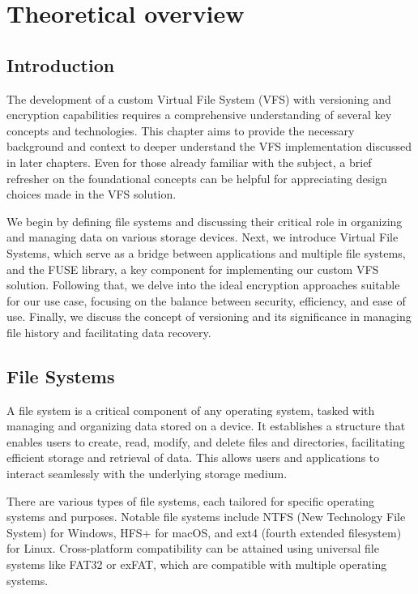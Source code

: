 \chapter{Theoretical overview}
\label{chap:refs}

\section{Introduction}\label{sec:introduction}

The development of a custom Virtual File System (VFS) with versioning and encryption capabilities requires a comprehensive understanding of several key concepts and technologies.
This chapter aims to provide the necessary background and context to deeper understand the VFS implementation discussed in later chapters.
Even for those already familiar with the subject, a brief refresher on the foundational concepts can be helpful for appreciating design choices made in the VFS solution.

We begin by defining file systems and discussing their critical role in organizing and managing data on various storage devices.
Next, we introduce Virtual File Systems, which serve as a bridge between applications and multiple file systems, and the FUSE library, a key component for implementing our custom VFS solution.
Following that, we delve into the ideal encryption approaches suitable for our use case, focusing on the balance between security, efficiency, and ease of use.
Finally, we discuss the concept of versioning and its significance in managing file history and facilitating data recovery.

\section{File Systems}\label{sec:file-systems}

A file system is a critical component of any operating system, tasked with managing and organizing data stored on a device.
It establishes a structure that enables users to create, read, modify, and delete files and directories, facilitating efficient storage and retrieval of data.
This allows users and applications to interact seamlessly with the underlying storage medium.

There are various types of file systems, each tailored for specific operating systems and purposes.
Notable file systems include NTFS (New Technology File System) for Windows, HFS+ for macOS, and ext4 (fourth extended filesystem) for Linux.
Cross-platform compatibility can be attained using universal file systems like FAT32 or exFAT, which are compatible with multiple operating systems.

